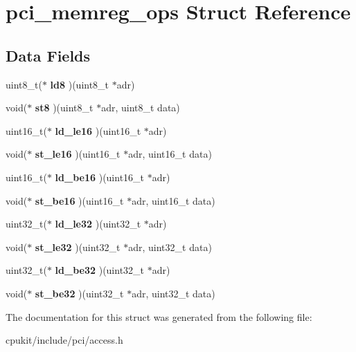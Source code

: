 \hypertarget{structpci__memreg__ops}{}\section{pci\+\_\+memreg\+\_\+ops Struct Reference}
\label{structpci__memreg__ops}
\subsection*{Data Fields}
\begin{DoxyCompactItemize}
\item 
\mbox{\label{structpci__memreg__ops_ac7c6d098385e28d4925d97189c4fade7}} 
uint8\+\_\+t($\ast$ {\bfseries ld8} )(uint8\+\_\+t $\ast$adr)
\item 
\mbox{\label{structpci__memreg__ops_a7a6115dbffb6f62491f2869f6ca24093}} 
void($\ast$ {\bfseries st8} )(uint8\+\_\+t $\ast$adr, uint8\+\_\+t data)
\item 
\mbox{\label{structpci__memreg__ops_af04083e663b599d4e5251295d095c163}} 
uint16\+\_\+t($\ast$ {\bfseries ld\+\_\+le16} )(uint16\+\_\+t $\ast$adr)
\item 
\mbox{\label{structpci__memreg__ops_a0d3a5f49afc573d0bbad23b3e2db0410}} 
void($\ast$ {\bfseries st\+\_\+le16} )(uint16\+\_\+t $\ast$adr, uint16\+\_\+t data)
\item 
\mbox{\label{structpci__memreg__ops_aef60748cf277bfd9eac0bf241b425439}} 
uint16\+\_\+t($\ast$ {\bfseries ld\+\_\+be16} )(uint16\+\_\+t $\ast$adr)
\item 
\mbox{\label{structpci__memreg__ops_a52f0af3c4b4664ff6fb6a149bab3ff7e}} 
void($\ast$ {\bfseries st\+\_\+be16} )(uint16\+\_\+t $\ast$adr, uint16\+\_\+t data)
\item 
\mbox{\label{structpci__memreg__ops_aee1af3069ac2789fcd9e88d627f040dd}} 
uint32\+\_\+t($\ast$ {\bfseries ld\+\_\+le32} )(uint32\+\_\+t $\ast$adr)
\item 
\mbox{\label{structpci__memreg__ops_a2da78e01c13a9e8b432a253fa902e9bb}} 
void($\ast$ {\bfseries st\+\_\+le32} )(uint32\+\_\+t $\ast$adr, uint32\+\_\+t data)
\item 
\mbox{\label{structpci__memreg__ops_a39812581b2dbfd3d7973e205ef41ad6e}} 
uint32\+\_\+t($\ast$ {\bfseries ld\+\_\+be32} )(uint32\+\_\+t $\ast$adr)
\item 
\mbox{\label{structpci__memreg__ops_a64d62117376c74bcd9eaddfaa5d3b363}} 
void($\ast$ {\bfseries st\+\_\+be32} )(uint32\+\_\+t $\ast$adr, uint32\+\_\+t data)
\end{DoxyCompactItemize}


The documentation for this struct was generated from the following file\+:\begin{DoxyCompactItemize}
\item 
cpukit/include/pci/access.\+h\end{DoxyCompactItemize}
